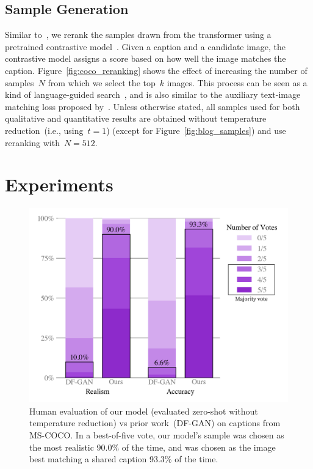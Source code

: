 \documentclass{article}
\begin{document}
\subsection{Sample Generation}
%
Similar to~\citet{razavi2019generating}, we rerank the samples drawn from the transformer using a pretrained contrastive model~\cite{radford2021learning}. Given a caption and a candidate image, the contrastive model assigns a score  based on how well the image matches the caption. Figure~\ref{fig:coco_reranking} shows the effect of increasing the number of samples~$N$ from which we select the top~$k$ images. This process can be seen as a kind of language-guided search~\cite{andreas2017learning}, and is also similar to the auxiliary text-image matching loss proposed by~\citet{xu2018attngan}. Unless otherwise stated, all samples used for both qualitative and quantitative results are obtained without temperature reduction~(i.e., using~$t=1$) (except for Figure~\ref{fig:blog_samples}) and use reranking with~$N = 512$.

\section{Experiments}
\label{sec:experiments}
%
\begin{figure}[t]
    \centering
    \includegraphics[width=\linewidth]{assets_v2_final_graph.png}
    \caption{Human evaluation of our model (evaluated zero-shot without temperature reduction) vs prior work~(DF-GAN) on captions from MS-COCO. In a best-of-five vote, our model's sample was chosen as the most realistic 90.0\% of the time, and was chosen as the image best matching a shared caption 93.3\% of the time.}
    \label{fig:human_eval}
\end{figure}
%
\end{document}
